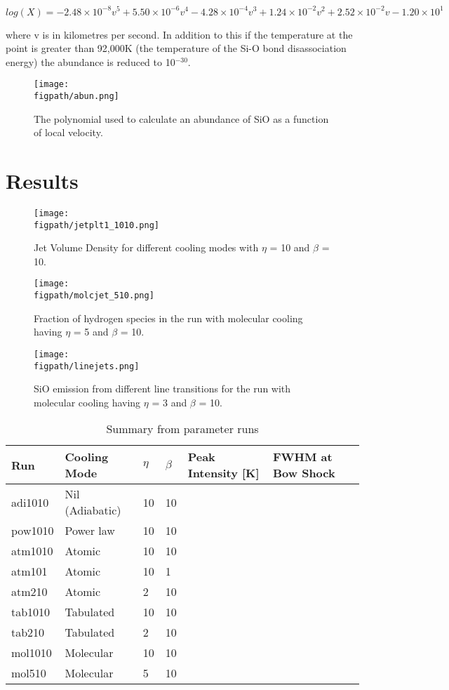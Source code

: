 \documentclass[useAMS,usenatbib,letters]{mn2e}
\newcommand{\figpath}{PFIGS/}
\begin{document}
$log(X)=-2.48\times10^{-8}v^5 + 5.50\times10^{-6}v^4 - 4.28\times10^{-4}v^3 + 1.24\times10^{-2}v^2 + 2.52\times10^{-2}v - 1.20\times10^{1}$\smallskip

where v is in kilometres per second. In addition to this if the temperature at the point is greater than 92,000K (the temperature of the Si-O bond disassociation energy) the abundance is reduced to 10$^{-30}$.

\begin{figure}
 \texttt{[image: \\figpath/abun.png]}
 \caption{The polynomial used to calculate an abundance of SiO as a function of local velocity.}
 \label{abun}
\end{figure}


\section{Results}
\begin{figure*}
 \texttt{[image: \\figpath/jetplt1\_1010.png]}
 \caption{Jet Volume Density for different cooling modes with
   $\eta$ = 10 and $\beta$ = 10.}
\label{grid}
\end{figure*}



\begin{figure*}
 \texttt{[image: \\figpath/molcjet\_510.png]}
 \caption{Fraction of hydrogen species in the run with molecular
   cooling having $\eta$ = 5 and $\beta$ = 10.}
\label{grid}
\end{figure*}

\begin{figure*}
 \texttt{[image: \\figpath/linejets.png]}
 \caption{SiO emission from different line transitions for the run with molecular
   cooling having $\eta$ = 3 and $\beta$ = 10. }
\label{grid}
\end{figure*}

\begin{table*}
\centering
\caption{Summary from parameter runs}
\begin{tabular}{l | l | l | l | l | l }
\hline
Run & Cooling Mode & $\eta$ & $\beta$ & Peak Intensity [K] & FWHM at Bow
Shock \\
\hline\hline
adi1010 & Nil (Adiabatic) & 10 & 10 &&\\
pow1010 & Power law & 10 & 10 &&\\
atm1010 & Atomic & 10 & 10 &&\\
atm101 & Atomic & 10 & 1 &&\\
atm210 & Atomic & 2 & 10 &&\\
tab1010 & Tabulated & 10 & 10 &&\\
tab210 & Tabulated & 2 & 10&&\\
mol1010 & Molecular & 10 & 10&&\\
mol510 & Molecular & 5 & 10&&\\
\hline
\end{tabular}
\label{tab:result1}


\end{table*}
\end{document}
